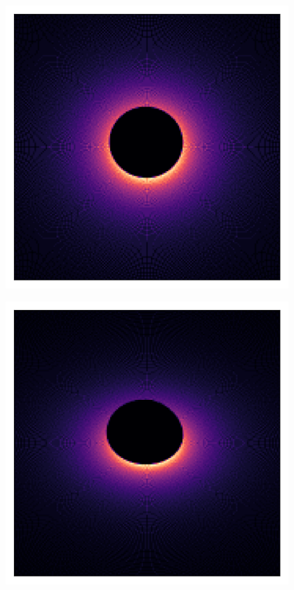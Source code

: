 \documentclass{beamer}
\begin{document}
\begin{frame}{}
    \centering

    \includegraphics[width=0.8\textwidth]{asset/bh_0.75_20.png}

\end{frame}


\begin{frame}{}
    \centering

    \includegraphics[width=0.8\textwidth]{asset/bh_0.75_45.png}

\end{frame}
\end{document}
